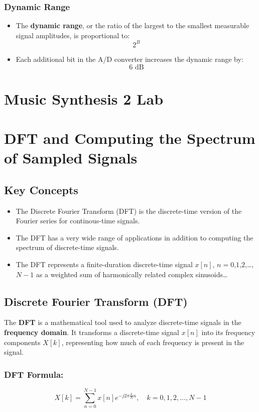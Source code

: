 \documentclass[12pt, letterpaper]{article}
\begin{document}
\subsubsection{Dynamic Range}
\begin{itemize}
    \item The \textbf{dynamic range}, or the ratio of the largest to the smallest measurable signal amplitudes, is proportional to:
    \[
    2^B
    \]
    \item Each additional bit in the A/D converter increases the dynamic range by:
    \[
    6 \text{ dB}
    \]
\end{itemize}

\newpage
\section{Music Synthesis 2 Lab}

\newpage
\section{DFT and Computing the Spectrum of Sampled Signals}

\subsection{Key Concepts}
\begin{itemize}
\item The Discrete Fourier Transform (DFT) is the discrete-time version of the Fourier series for continous-time signals.
\item The DFT has a very wide range of applications in addition to computing the spectrum of discrete-time signals. 
\item The DFT represents a finite-duration discrete-time signal $x[n]$, $n=0$,$1$,$2$,\dots,$N-1$ as a weighted sum of harmonically related complex sinusoids\dots
\end{itemize}

\subsection{Discrete Fourier Transform (DFT)}
The \textbf{DFT} is a mathematical tool used to analyze discrete-time signals in the \textbf{frequency domain}. It transforms a discrete-time signal \( x[n] \) into its frequency components \( X[k] \), representing how much of each frequency is present in the signal.

\subsubsection*{DFT Formula:}
\[
X[k] = \sum_{n=0}^{N-1} x[n] e^{-j 2\pi \frac{k}{N} n}, \quad k = 0, 1, 2, \dots, N-1
\]
\end{document}
